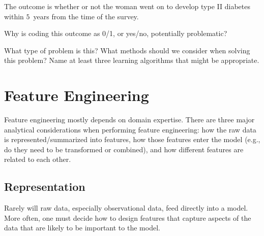 The outcome is whether or not the woman went on to develop type II diabetes within $5$~years from the time of the survey. 

\begin{question}{}
Why is coding this outcome as 0/1, or yes/no, potentially problematic?
\end{question}

\begin{question}{}
What type of problem is this? What methods should we consider when solving this problem? Name at least three learning algorithms that might be appropriate. 
\end{question}


\section{Feature Engineering}

Feature engineering mostly depends on domain expertise. There are three major analytical considerations when performing feature engineering: how the raw data is represented/summarized into features, how those features enter the model (e.g., do they need to be transformed or combined), and how different features are related to each other. 

\subsection{Representation}

Rarely will raw data, especially observational data, feed directly into a model. More often, one must decide how to design features that capture aspects of the data that are likely to be important to the model. 

\vspace{2mm}

